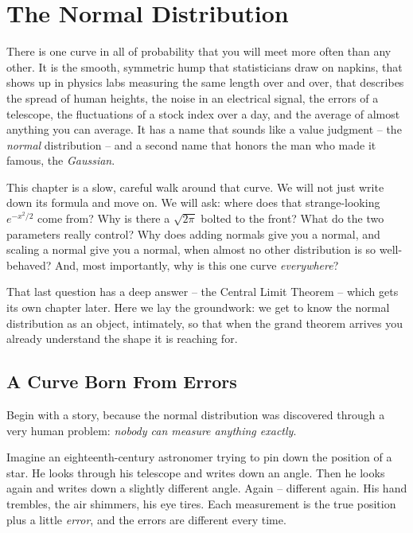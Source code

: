 \chapter{The Normal Distribution}

There is one curve in all of probability that you will meet more often than any
other. It is the smooth, symmetric hump that statisticians draw on napkins, that
shows up in physics labs measuring the same length over and over, that describes
the spread of human heights, the noise in an electrical signal, the errors of a
telescope, the fluctuations of a stock index over a day, and the average of
almost anything you can average. It has a name that sounds like a value judgment
-- the \emph{normal} distribution -- and a second name that honors the man who
made it famous, the \emph{Gaussian}.

This chapter is a slow, careful walk around that curve. We will not just write
down its formula and move on. We will ask: where does that strange-looking
$e^{-x^2/2}$ come from? Why is there a $\sqrt{2\pi}$ bolted to the front? What do
the two parameters really control? Why does adding normals give you a normal,
and scaling a normal give you a normal, when almost no other distribution is so
well-behaved? And, most importantly, why is this one curve \emph{everywhere}?

That last question has a deep answer -- the Central Limit Theorem -- which gets
its own chapter later. Here we lay the groundwork: we get to know the normal
distribution as an object, intimately, so that when the grand theorem arrives you
already understand the shape it is reaching for.

\chapterline

\section{A Curve Born From Errors}
\label{ch12:errors}

Begin with a story, because the normal distribution was discovered through a very
human problem: \emph{nobody can measure anything exactly}.

Imagine an eighteenth-century astronomer trying to pin down the position of a
star. He looks through his telescope and writes down an angle. Then he looks
again and writes down a slightly different angle. Again -- different again. His
hand trembles, the air shimmers, his eye tires. Each measurement is the true
position plus a little \emph{error}, and the errors are different every time.

